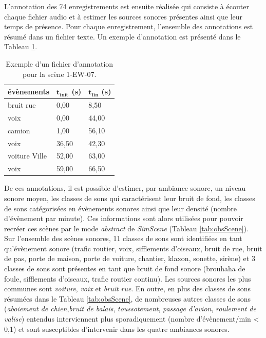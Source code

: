 L'annotation des 74 enregistrements est ensuite réalisée qui consiste à écouter chaque fichier audio et à estimer les sources sonores présentes ainsi que leur temps de présence. Pour chaque enregistrement, l'ensemble des annotations est résumé dans un fichier texte. Un exemple d'annotation est présenté dans le Tableau \ref{tab:exemple_annotation}.\\

\begin{table}[h]
\centering
\begin{tabular}{lll}
\toprule
\textbf{évènements}    & $\mathbf{t_{init}}$ \textbf{(s)} & $\mathbf{t_{fin}}$ \textbf{(s)} \\ \midrule
bruit rue     & 0,00            & 8,50           \\
\rowcolor[HTML]{C0C0C0}
voix          & 0,00            & 44,00          \\
camion        & 1,00            & 56,10          \\
\rowcolor[HTML]{C0C0C0}
voix          & 36,50           & 42,30          \\
voiture Ville & 52,00          & 63,00          \\
\rowcolor[HTML]{C0C0C0}
voix          & 59,00           & 66,50         \\ \bottomrule
\end{tabular}
\caption{Exemple d'un fichier d'annotation pour la scène 1-EW-07.}
\label{tab:exemple_annotation}
\end{table}



De ces annotations, il est possible d'estimer, par ambiance sonore, un niveau sonore moyen, les classes de sons qui caractérisent leur bruit de fond, les classes de sons catégorisées en évènements sonores ainsi que leur densité (nombre d'évènement par minute). Ces informations sont alors utilisées pour pouvoir recréer ces scènes par le mode \textit{abstract} de \textit{SimScene} (Tableau \ref{tab:obsScene}).\\

Sur l'ensemble des scènes sonores, 11 classes de sons sont identifiées en tant qu'évènement sonore (trafic routier, voix, sifflements d'oiseaux, bruit de rue, bruit de pas, porte de maison, porte de voiture, chantier, klaxon, sonette, sirène) et 3 classes de sons sont présentes en tant que bruit de fond sonore (brouhaha de foule, sifflements d'oiseaux, trafic routier continu).
Les sources sonores les plus communes sont \textit{voiture}, \textit{voix} et \textit{bruit rue}. En outre, en plus des classes de sons résumées dans le Tableau \ref{tab:obsScene}, de nombreuses autres classes de sons (\textit{aboiement de chien},\textit{bruit de balais}, \textit{toussotement}, \textit{passage d'avion}, \textit{roulement de valise}) entendus interviennent plus sporadiquement (nombre d'évènement/min < 0,1) et sont susceptibles d'intervenir dans les quatre ambiances sonores.

